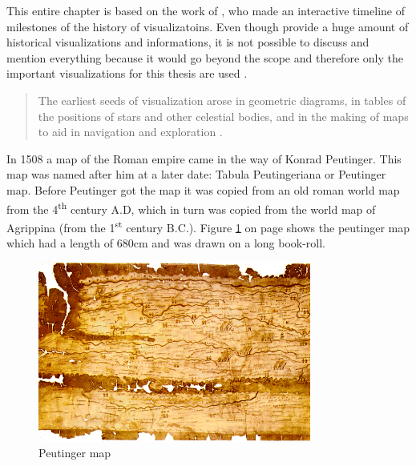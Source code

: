 This entire chapter is based on the work of \citeauthor{Friendly.2001}, who made an interactive timeline of milestones of the history of visualizatoins. Even though \citeauthor{Friendly.2001} provide a huge amount of historical visualizations and informations, it is not possible to discuss and mention everything because it would go beyond the scope and therefore only the important visualizations for this thesis are used .

\begin{quote}
    The earliest seeds of visualization arose in geometric diagrams, in tables of the positions of stars and other celestial bodies, and in the making of maps to aid in navigation and exploration .
\end{quote}

In 1508 a map of the Roman empire came in the way of Konrad Peutinger. This map was named after him at a later date: Tabula Peutingeriana or Peutinger map. Before Peutinger got the map it was copied from an old roman world map from the 4\textsuperscript{th} century A.D, which in turn was copied from the world map of Agrippina (from the 1\textsuperscript{st} century B.C.). Figure \ref{fig:peutinger} on page \pageref{fig:peutinger} shows the peutinger map which had a length of 680cm and was drawn on a long book-roll.

\begin{figure}[!htb]
\centering
\includegraphics[width=0.8\textwidth,keepaspectratio]{images/history/peutinger.png}
\caption[
    Peutinger map, Urldate: 07.2016 \newline
\small\texttt{\url{https://web.archive.org/web/20080129123649/http://www.kargi.de/Geschichte/Peutinger/Peutinger.bmp}}
]{Peutinger map}
\label{fig:peutinger}
\end{figure}

